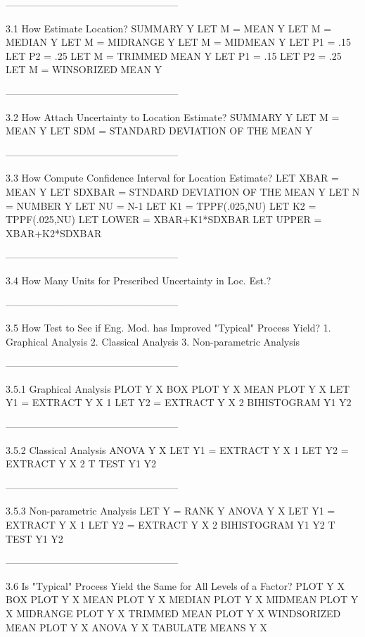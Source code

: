 -----------------------------------------------------
 
3.1
How Estimate Location?
      SUMMARY Y
      LET M = MEAN Y
      LET M = MEDIAN Y
      LET M = MIDRANGE Y
      LET M = MIDMEAN Y
      LET P1 = .15
      LET P2 = .25
      LET M = TRIMMED MEAN Y
      LET P1 = .15
      LET P2 = .25
      LET M = WINSORIZED MEAN Y
 
-----------------------------------------------------
 
3.2
How Attach Uncertainty to Location Estimate?
      SUMMARY Y
      LET M = MEAN Y
      LET SDM = STANDARD DEVIATION OF THE MEAN Y
 
-----------------------------------------------------
 
3.3
How Compute Confidence Interval for Location Estimate?
      LET XBAR = MEAN Y
      LET SDXBAR = STNDARD DEVIATION OF THE MEAN Y
      LET N = NUMBER Y
      LET NU = N-1
      LET K1 = TPPF(.025,NU)
      LET K2 = TPPF(.025,NU)
      LET LOWER = XBAR+K1*SDXBAR
      LET UPPER = XBAR+K2*SDXBAR
 
-----------------------------------------------------
 
3.4
How Many Units for Prescribed Uncertainty in Loc. Est.?
 
-----------------------------------------------------
 
3.5
How Test to See if Eng. Mod. has Improved "Typical" Process Yield?
   1. Graphical Analysis
   2. Classical Analysis
   3. Non-parametric Analysis
 
-----------------------------------------------------
 
3.5.1
Graphical Analysis
      PLOT Y X
      BOX PLOT Y X
      MEAN PLOT Y X
      LET Y1 = EXTRACT Y X 1
      LET Y2 = EXTRACT Y X 2
      BIHISTOGRAM Y1 Y2
 
-----------------------------------------------------
 
3.5.2
Classical Analysis
      ANOVA Y X
      LET Y1 = EXTRACT Y X 1
      LET Y2 = EXTRACT Y X 2
      T TEST Y1 Y2
 
-----------------------------------------------------
 
3.5.3
Non-parametric Analysis
      LET Y = RANK Y
      ANOVA Y X
      LET Y1 = EXTRACT Y X 1
      LET Y2 = EXTRACT Y X 2
      BIHISTOGRAM Y1 Y2
      T TEST Y1 Y2
 
-----------------------------------------------------
 
3.6
Is "Typical" Process Yield the Same for All Levels of a Factor?
      PLOT Y X
      BOX PLOT Y X
      MEAN PLOT Y X
      MEDIAN PLOT Y X
      MIDMEAN PLOT Y X
      MIDRANGE PLOT Y X
      TRIMMED MEAN PLOT Y X
      WINDSORIZED MEAN PLOT Y X
      ANOVA Y X
      TABULATE MEANS Y X
 
